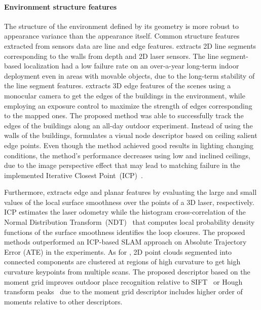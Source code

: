 \paragraph{Environment structure features}

The structure of the environment defined by its geometry is more robust to appearance variance than the appearance itself. Common structure features extracted from sensors data are line and edge features.
\cite{biswas-veloso:2013:0278364913503892} extracts 2D line segments corresponding to the walls from depth and 2D laser sensors. The line segment-based localization had a low failure rate on an over-a-year long-term indoor deployment even in areas with movable objects, due to the long-term stability of the line segment features.
\cite{nuske-et-al:2009:20306} extracts 3D edge features of the scenes using a monocular camera to get the edges of the buildings in the environment, while employing an exposure control to maximize the strength of edges corresponding to the mapped ones. The proposed method was able to successfully track the edges of the buildings along an all-day outdoor experiment.
Instead of using the walls of the buildings, \cite{an-et-al:2016:0} formulates a visual node descriptor based on ceiling salient edge points. Even though the method achieved good results in lighting changing conditions, the method's performance decreases using low and inclined ceilings, due to the image perspective effect that may lead to matching failure in the implemented Iterative Closest Point~(ICP)~\parencite{original:icp}.

Furthermore, \cite{meng-et-al:2021:3062647} extracts edge and planar features by evaluating the large and small values of the local surface smoothness over the points of a 3D laser, respectively. ICP estimates the laser odometry while the histogram cross-correlation of the Normal Distribution Transform~(NDT)~\parencite{original:ndt} that computes local probability density functions of the surface smoothness identifies the loop closures.
The proposed methods outperformed an ICP-based SLAM approach on Absolute Trajectory Error (ATE) in the experiments.
As for \cite{bosse-zlot:2009:009}, 2D point clouds segmented into connected components are clustered at regions of high curvature to get high curvature keypoints from multiple scans.
The proposed descriptor based on the moment grid improves outdoor place recognition relative to SIFT~\parencite{original:sift} or Hough transform peaks~\parencite{original:hough-peaks} due to the moment grid descriptor includes higher order of moments relative to other descriptors.

